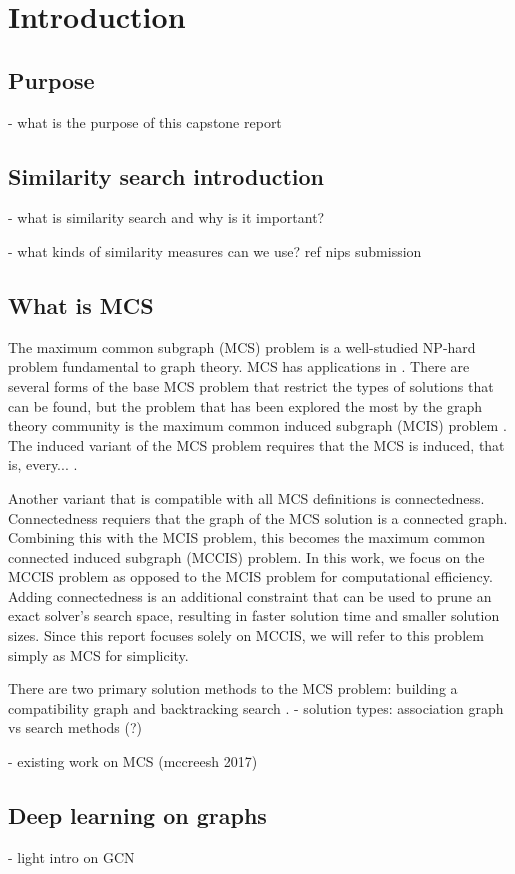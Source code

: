 \section{Introduction}
\subsection{Purpose}
- what is the purpose of this capstone report
\subsection{Similarity search introduction}
- what is similarity search and why is it important?



- what kinds of similarity measures can we use? ref nips submission
\subsection{What is MCS}
The maximum common subgraph (MCS) problem is a well-studied NP-hard problem  fundamental to graph theory. MCS has applications in . There are several forms of the base MCS problem that restrict the types of solutions that can be found, but the problem that has been explored the most by the graph theory community is the maximum common induced subgraph (MCIS) problem \cite{vismara2008finding}. The induced variant of the MCS problem requires that the MCS is induced, that is, every... . 

Another variant that is compatible with all MCS definitions is connectedness. Connectedness requiers that the graph of the MCS solution is a connected graph. Combining this with the MCIS problem, this becomes the maximum common connected induced subgraph (MCCIS) problem. In this work, we focus on the MCCIS problem as opposed to the MCIS problem for computational efficiency. Adding connectedness is an additional constraint that can be used to prune an exact solver's search space, resulting in faster solution time and smaller solution sizes. Since this report focuses solely on MCCIS, we will refer to this problem simply as MCS for simplicity.

There are two primary solution methods to the MCS problem: building a compatibility graph  and backtracking search . 
- solution types: association graph vs search methods (?)


- existing work on MCS (mccreesh 2017)

\subsection{Deep learning on graphs}
- light intro on GCN
